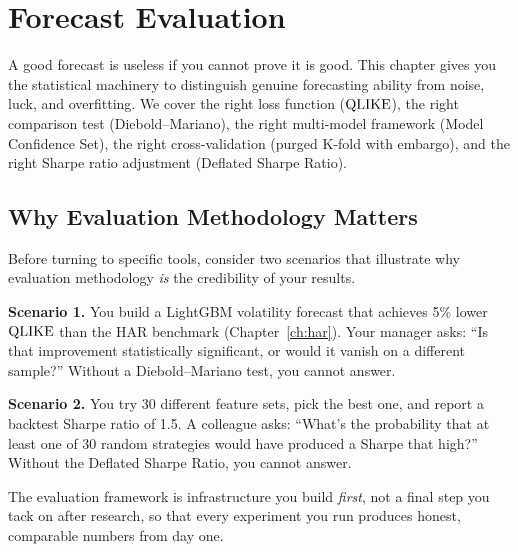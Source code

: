 \chapter{Forecast Evaluation}
\label{ch:evaluation}

A good forecast is useless if you cannot prove it is good.
This chapter gives you the statistical machinery to distinguish genuine forecasting ability from noise, luck, and overfitting.
We cover the right loss function ($\operatorname{QLIKE}$), the right comparison test (Diebold--Mariano), the right multi-model framework (Model Confidence Set), the right cross-validation (purged K-fold with embargo), and the right Sharpe ratio adjustment (Deflated Sharpe Ratio).


\section{Why Evaluation Methodology Matters}
\label{sec:eval-why}

Before turning to specific tools, consider two scenarios that illustrate why evaluation methodology \emph{is} the credibility of your results.

\textbf{Scenario 1.}
You build a LightGBM volatility forecast that achieves 5\% lower $\operatorname{QLIKE}$ than the HAR benchmark (Chapter~\ref{ch:har}).
Your manager asks: ``Is that improvement statistically significant, or would it vanish on a different sample?''
Without a Diebold--Mariano test, you cannot answer.

\textbf{Scenario 2.}
You try 30 different feature sets, pick the best one, and report a backtest Sharpe ratio of 1.5.
A colleague asks: ``What's the probability that at least one of 30 random strategies would have produced a Sharpe that high?''
Without the Deflated Sharpe Ratio, you cannot answer.

The evaluation framework is infrastructure you build \emph{first}, not a final step you tack on after research, so that every experiment you run produces honest, comparable numbers from day one.

